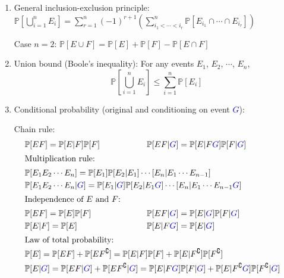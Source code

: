 \documentclass{article}
\begin{document}
\begin{enumerate}
	\item General inclusion-exclusion principle: $\displaystyle\mathbb{P}\left[\bigcup_{i=1}^n E_i\right]=\sum_{r=1}^{n}(-1)^{r+1}\left(\sum_{i_1<\cdots<i_r}^{n}\mathbb{P}[E_{i_1}\cap\cdots\cap E_{i_r}]\right)$ 
		
		Case $n=2$: $\mathbb{P}[E\cup F]=\mathbb{P}[E]+\mathbb{P}[F]-\mathbb{P}[E\cap F]$
	
	\item Union bound (Boole's inequality): For any events $E_1$, $E_2$, $\cdots$, $E_n$,
		$$\displaystyle\mathbb{P}\left[\bigcup_{i=1}^n E_i\right]\leq\sum_{i=1}^{n}\mathbb{P}[E_i]$$
		
	\item Conditional probability (original and conditioning on event \textcolor{blue}{$G$}):
	
		Chain rule:
		\begin{align*}
			&\mathbb{P}[EF]=\mathbb{P}[E|F]\mathbb{P}[F] &&\hspace*{-6cm}\mathbb{P}[EF|\textcolor{blue}{G}]=\mathbb{P}[E|F\textcolor{blue}{G}]\mathbb{P}[F|\textcolor{blue}{G}] \\
			\intertext{Multiplication rule:}
			&\mathbb{P}[E_1E_2\cdots E_n]=\mathbb{P}[E_1]\mathbb{P}[E_2|E_1]\cdots\mathbb[E_n|E_1\cdots E_{n-1}] && \\
			&\mathbb{P}[E_1E_2\cdots E_n|\textcolor{blue}{G}]=\mathbb{P}[E_1|\textcolor{blue}{G}]\mathbb{P}[E_2|E_1\textcolor{blue}{G}]\cdots\mathbb[E_n|E_1\cdots E_{n-1}\textcolor{blue}{G}] && \\
			\intertext{Independence of $E$ and $F$:}
			&\mathbb{P}[EF]=\mathbb{P}[E]\mathbb{P}[F] &&\hspace*{-6cm}\mathbb{P}[EF|\textcolor{blue}{G}]=\mathbb{P}[E|\textcolor{blue}{G}]\mathbb{P}[F|\textcolor{blue}{G}] \\
			&\mathbb{P}[E|F]=\mathbb{P}[E] &&\hspace*{-6cm}\mathbb{P}[E|F\textcolor{blue}{G}]=\mathbb{P}[E|\textcolor{blue}{G}] \\
			\intertext{Law of total probability:}
			&\mathbb{P}[E]=\mathbb{P}[EF]+\mathbb{P}[EF^\complement]=\mathbb{P}[E|F]\mathbb{P}[F]+\mathbb{P}[E|F^\complement]\mathbb{P}[F^\complement] && \\
			&\mathbb{P}[E|\textcolor{blue}{G}]=\mathbb{P}[EF|\textcolor{blue}{G}]+\mathbb{P}[EF^\complement|\textcolor{blue}{G}]=\mathbb{P}[E|F\textcolor{blue}{G}]\mathbb{P}[F|\textcolor{blue}{G}]+\mathbb{P}[E|F^\complement\textcolor{blue}{G}]\mathbb{P}[F^\complement|\textcolor{blue}{G}] && \\

\end{align*}
\end{enumerate}
\end{document}

